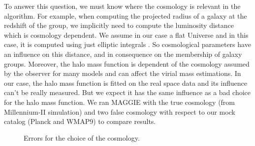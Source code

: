 To answer this question, we must know where the cosmology is relevant in the
algorithm. For example, when computing the projected radius of a galaxy at the
redshift of the group, we implicitly need to compute the luminosity distance
which is cosmology dependent. We assume in our case a flat Universe and in this
case, it is computed using just elliptic integrals
\citep{Liu+11,Eisenstein+97}. So cosmological parameters have an influence on
this distance, and in consequence on the membership of galaxy groups. Moreover,
the halo mass function is dependent of the cosmology assumed by the observer
for many models and can affect the virial mass estimations. In our case, the
halo mass function is fitted on the real space data and its influence can't be
really measured. But we expect it has the same influence as a bad choice for
the halo mass function. We ran MAGGIE with the true cosmology (from
Millennium-II simulation) and two false cosmology with respect to our mock
catalog (Planck and WMAP9) to compare results.
%
\begin{figure}[htbp]
    \centering
    \begin{minipage}{\linewidth}
        \centering
        \begin{minipage}{0.49\linewidth}
        \end{minipage}
        \begin{minipage}{0.49\linewidth}
        \end{minipage}
    \end{minipage}
    \begin{minipage}{\linewidth}
        \centering
        \begin{minipage}{0.49\linewidth}
        \end{minipage}
        \begin{minipage}{0.49\linewidth}
        \end{minipage}
        \begin{minipage}{0.49\linewidth}
        \end{minipage}
        \caption{Errors for the choice of the
        cosmology.\label{fig:bias_disp_cosmology}}
    \end{minipage}
\end{figure}

